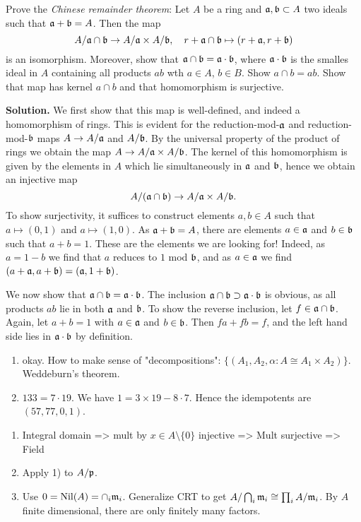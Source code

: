 \documentclass[a4paper,11pt]{article}
\begin{document}
Prove the \textit{Chinese remainder theorem}: Let $A$ be a ring and $\mathfrak{a}, \mathfrak{b}
\subset A$ two ideals such that $\mathfrak{a} + \mathfrak{b} = A$. Then the map 
\begin{equation*}
    A/ \mathfrak{a} \cap \mathfrak{b} \to A/ \mathfrak{a} \times A/\mathfrak{b}, \quad 
    r + \mathfrak{a} \cap \mathfrak{b} \mapsto (r + \mathfrak{a}, r + \mathfrak{b})
\end{equation*}
is an isomorphism. Moreover, show that $\mathfrak{a} \cap \mathfrak{b} = \mathfrak{a} \cdot \mathfrak{b}$, where
$\mathfrak{a} \cdot \mathfrak{b}$ is the smalles ideal in $A$ containing all products $ab$ 
wth $a \in A$, $b \in B$. 
Show $a \cap b = ab$. Show that map has kernel $a \cap b$ and that homomorphism is surjective. 

\textbf{Solution.} We first show that this map is well-defined, and indeed a 
homomorphism of rings. This is evident for the reduction-mod-$\mathfrak{a}$ and 
reduction-mod-$\mathfrak{b}$ maps $A \to A/\mathfrak{a}$ and $A/\mathfrak{b}$. By the universal property of 
the product of rings we obtain the map $A \to A/\mathfrak{a} \times A/\mathfrak{b}$. The kernel
of this homomorphism is given by the elements in $A$ which lie simultaneously in 
$\mathfrak{a}$ and $\mathfrak{b}$, hence we obtain an injective map 
\begin{equation*}
    A/(\mathfrak{a} \cap \mathfrak{b}) \to A/\mathfrak{a} \times A/\mathfrak{b}.
\end{equation*}
To show surjectivity, it suffices to construct elements $a, b \in A$ such that 
$a \mapsto (0,1)$ and $a \mapsto (1,0)$. As $\mathfrak{a} + \mathfrak{b} = A$, there are elements
$a \in \mathfrak{a}$ and $b \in \mathfrak{b}$ such that $a + b = 1$. These are the elements we 
are looking for! Indeed, as $a = 1 - b$ we find that $a$ reduces to $1$ mod $\mathfrak{b}$,
and as $a \in \mathfrak{a}$ we find $(a + \mathfrak{a}, a + \mathfrak{b}) = (\mathfrak{a}, 1 + \mathfrak{b})$. 

We now show that $\mathfrak{a} \cap \mathfrak{b} = \mathfrak{a} \cdot \mathfrak{b}$. The inclusion 
$\mathfrak{a} \cap \mathfrak{b} \supset \mathfrak{a} \cdot \mathfrak{b}$ is obvious, as all products $ab$ lie in both
$\mathfrak{a}$ and $\mathfrak{b}$. To show the reverse inclusion, let $f \in \mathfrak{a} \cap \mathfrak{b}$. Again,
let $a + b = 1$ with $a \in \mathfrak{a}$ and $b \in \mathfrak{b}$. Then $fa + fb = f$, and the 
left hand side lies in $\mathfrak{a} \cdot \mathfrak{b}$ by definition. 


\begin{enumerate}
    \item okay. How to make sense of "decompositions": $\{(A_1, A_2, \alpha: A \cong A_1 \times A_2)\}$.  Weddeburn's theorem.
    \item $133 = 7 \cdot 19$. We have $1 = 3 \times 19 - 8\cdot 7$. Hence the idempotents are $(57, 77, 0,1)$.
\end{enumerate} 

\begin{enumerate}
    \item Integral domain => mult by $x \in A\setminus\{0\}$ injective => Mult surjective => Field
    \item Apply 1) to $A/\mathfrak{p}$. 
    \item Use $0 = \operatorname{Nil}(A) = \cap_i \mathfrak{m}_i$. Generalize CRT to get $A/\bigcap_i \mathfrak{m}_i \cong \prod_i A/\mathfrak{m}_i$. 
        By $A$ finite dimensional, there are only finitely many factors. 
\end{enumerate}
\end{document}

